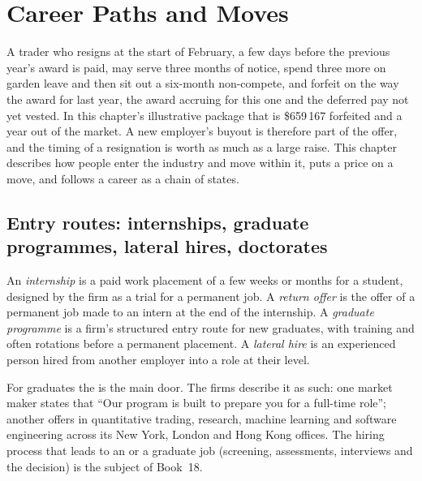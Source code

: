 \chapter{Career Paths and Moves}\label{ch:in:career-paths-and-moves}

A trader who resigns at the start of February, a few days before the previous year's award is paid, may serve three
months of notice, spend three more on garden leave and then sit out a six-month non-compete, and forfeit on the way the
award for last year, the award accruing for this one and the deferred pay not yet vested. In this chapter's illustrative
package that is \$659\,167 forfeited and a year out of the market. A new employer's buyout is therefore part of the
offer, and the timing of a resignation is worth as much as a large raise. This chapter describes how people enter the
industry and move within it, puts a price on a move, and follows a career as a chain of states.

\section{Entry routes: internships, graduate programmes, lateral hires, doctorates}

\begin{definition}\label{def:in:career-paths-and-moves:entry}
An \emph{internship} is a paid work placement of a few weeks or months for a student, designed by the
firm as a trial for a permanent job. A \emph{return offer} is the offer of a permanent job made to an
intern at the end of the internship. A \emph{graduate programme} is a firm's structured entry
route for new graduates, with training and often rotations before a permanent placement. A \emph{lateral
hire} is an experienced person hired from another employer into a role at their level.
\end{definition}

For graduates the  is the main door. The firms describe it as such: one market maker states that ``Our
 program is built to prepare you for a full-time role''; another offers  in quantitative trading,
research, machine learning and software engineering across its New York, London and Hong Kong offices. The hiring
process that leads to an  or a graduate job (screening, assessments, interviews and the decision) is the
subject of Book~18.

